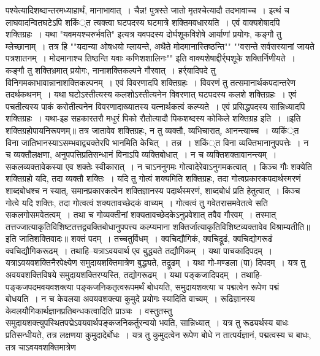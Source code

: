 पश्येत्यादिशब्दान्तरमध्याहार्थं, मानाभावात्~। चैन्न! पुत्रस्ते जातो मृतश्चेत्यादौ तदभावाच्च~।
इत्थं च लाघवादन्वितघटेऽपि शकिं्त त्यक्त्वा घटपदस्य घटमात्रे शक्तिमवधारयति~।
एवं वाक्यशेषादपि शक्तिग्रहः~। यथा "यवमयश्चरुर्भवति" इत्यत्र यवपदस्य दोर्घशूकविशेषे आर्याणां प्रयोगः, कङ्गौ तु म्लेच्छानाम्~। तत्र हि ""यदान्या ओषधयो
म्लायन्ते, अथैते मोदमानास्तिष्ठन्ति""
""वसन्ते सर्वसस्यानां जायते पत्रशातनम्~।
मोदमानाश्च तिष्ठन्ति यवाः कणिशशालिनः""
इति वाक्यशेषाद्दीर्र्घशूके शक्तिर्निणीयते~। कङ्गौ तु शक्तिभ्रमात् प्रयोगः, नानाशक्तिकल्पने गौरवात्~। हर्र्यादिपदे तु विनिगमकाभावान्नानाशक्तिकल्पनम्~।
एवं विवरणादपि शक्तिग्रहः~। विवरणं तु तत्समानार्थकपदान्तरेण तदर्थकथनम्~। यथा घटोऽस्तीत्यस्य कलशोऽस्तीत्यनेन विवरणात् घटपदस्य कलशे शक्तिग्रहः~।
एवं पचतीत्यस्य पाकं करोतीत्यनेन विवरणादाख्यातस्य यत्नार्थकत्वं कल्प्यते~।
एवं प्रसिद्धपदस्य सान्निध्यादपि शक्तिग्रहः~। यथा-इह सहकारतरौ मधुरं पिको रौतोत्यादौ पिकशब्दस्य कोकिले शक्तिग्रह इति~।
॥इति शक्तिग्रहोपायनिरूपणम्॥
तत्र जातावेव शक्तिग्रहः, न तु व्यक्तौ, व्यभिचारात्, आनन्त्याच्च~। व्यकिं्त विना जातिभानस्याऽसम्भवाद्व्यक्तेरपि भानमिति केचित्~।
तन्न~। शकिं्त विना व्यक्तिभानानुपपत्तेः~। न च व्यक्तौलक्षणा, अनुपपत्तिप्रतिसन्धानं विनाऽपि व्यक्तिबोधात्~। न च व्यक्तिशक्तावानन्त्यम्~। सकलव्यक्तावेकस्या एव
शक्तेः स्वीकारात्~। न चाऽननुगमः गोत्वादेरेवाऽनुगमकत्वात्~। किञ्च गौः शक्येति शक्तिग्रहो यदि, तदा व्यक्तौ शक्तिः~। यदि तु गोत्वं शक्यमिति शक्तिग्रहः, तदा
गोत्वप्रकारकपदार्थस्मरणं शाब्दबोधश्च न स्यात्, समानप्रकारकत्वेन शक्तिज्ञानस्य पदार्थस्मरणं, शाब्दबोधं प्रति हेतुत्वात्~। किञ्च गोत्वे यदि शक्तिः, तदा गोत्वत्वं
शक्यतावच्छेदकं वाच्यम्~। गोत्वत्वं तु गवेतरासमवेतत्वे सति सकलगोसमवेतत्वम्~। तथा च गोव्यक्तीनां शक्यतावच्छेदकेऽनुप्रवेशात् तवैव गौरवम्~। तस्मात्
तत्तज्जात्याकृतिविशिष्टतत्तद्व्यक्तिबोधानुपपत्त्य कल्प्यमाना शक्तिर्जात्याकृतिविशिष्टव्यक्तावेव विश्राम्यतीति॥इति जातिशक्तिवादः॥
शक्तं पदम्~। तच्चतुर्विधम्~। क्वचिद्यौगिकं, क्वचिद्रूढं, क्वचिद्योगरूढं क्वचिद्यौगिकरूढम्~।
तथाहि--यत्राऽवयवार्थ एव बुद्ध्यते तद्यौगिकम्~। यथा पाचकादिपदम्~।
यत्राऽवयवशक्तिनैरपेक्ष्येण समुदायशक्तिमात्रेण बुद्ध्यते, तद्रूढम्~। यथा गो-मण्डला (पा) दिपदम्~।
यत्र तु अवयवशक्तिविषये समुदायशक्तिरप्यस्ति, तद्योगरूढम्~। यथा पङ्कजादिपदम्~। तथाहि-पङ्कजपदमवयवशक्त्या पङ्कजनिकतृत्वरूपमर्थं बोधयति,
समुदायशक्त्या च पद्मत्वेन रूपेण पद्मं बोधयति~। न च केवलया अवयवशक्त्या कुमुदे प्रयोगः स्यादिति वाच्यम्~। रूढिज्ञानस्य केवलयौगिकार्थज्ञानप्रतिबन्धकत्वादिति
प्राञ्चः~।
वस्तुतस्तु समुदायशक्त्युपस्थितपद्मेऽवयवार्थपङ्कजनिकर्तुरन्वयो भवति, सान्निध्यात्~।
यत्र तु रूढ्यर्थस्य बाधः प्रतिसन्धीयते, तत्र लक्षणया कुमुदादेर्बोधः~। यत्र तु कुमुदत्वेन रूपेण बोधे न तात्पर्यज्ञानं, पद्मत्वस्य च बाधः, तत्र चाऽवयवशक्तिमात्रेण
